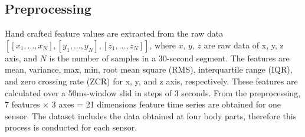 \documentclass{svmult}
\begin{document}
\subsection{Preprocessing}
Hand crafted feature values are extracted from the raw data $[[x_1,\dots, x_N], [y_1, \dots, y_N], [z_1, \dots, z_N]]$, where $x$, $y$, $z$ are raw data of x, y, z axis, and $N$ is the number of samples in a 30-second segment. The features are mean, variance, max, min, root mean square (RMS), interquartile range (IQR), and zero crossing rate (ZCR) for x, y, and z axis, respectively. These features are calculated over a 50ms-window slid in steps of 3 seconds. From the preprocessing, 7 features $\times$ 3 axes = 21 dimensions feature time series are obtained for one sensor. The dataset includes the data obtained at four body parts, therefore this process is conducted for each sensor.
\end{document}
